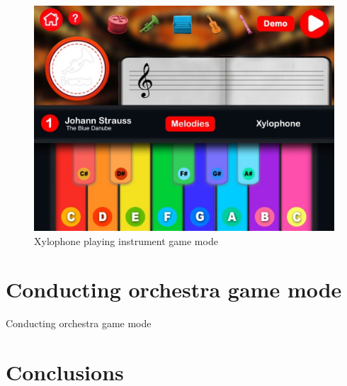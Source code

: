 \begin{figure}[ht!]
	\centering
	\includegraphics[width=400pt]{graphics/use-case/playing_xylo_start_screen.jpg}
	\caption{Xylophone playing instrument game mode}
	\label{fig:playing_xylo_start_screen}
\end{figure}

\FloatBarrier

\newpage
\section{Conducting orchestra game mode}
\label{sec:conductingorchestragm}

Conducting orchestra game mode

\newpage
\section{Conclusions}

